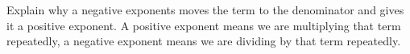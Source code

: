 {Explain why a negative exponents moves the term to the denominator and gives it a positive exponent.}
{A positive exponent means we are multiplying that term repeatedly, a negative exponent means we are dividing by that term repeatedly.}
